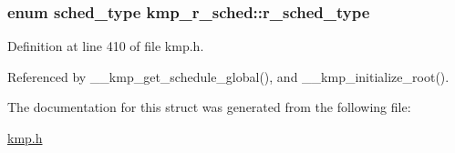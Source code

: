 \hypertarget{structkmp__r__sched_adc5935f3b0a5ef40ba9b9a019f815fc1}{
\subsubsection[{r\-\_\-sched\-\_\-type}]{\setlength{\rightskip}{0pt plus 5cm}enum {\bf sched\-\_\-type} kmp\-\_\-r\-\_\-sched\-::r\-\_\-sched\-\_\-type}}\label{structkmp__r__sched_adc5935f3b0a5ef40ba9b9a019f815fc1}


Definition at line 410 of file kmp.\-h.



Referenced by \-\_\-\-\_\-kmp\-\_\-get\-\_\-schedule\-\_\-global(), and \-\_\-\-\_\-kmp\-\_\-initialize\-\_\-root().



The documentation for this struct was generated from the following file\-:\begin{DoxyCompactItemize}
\item 
\hyperlink{kmp_8h}{kmp.\-h}\end{DoxyCompactItemize}

